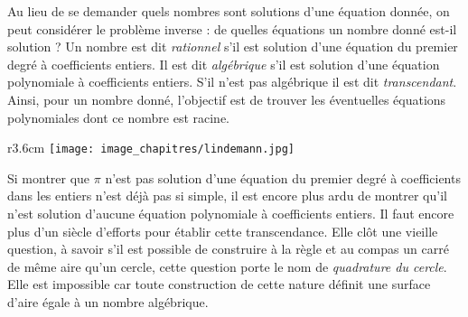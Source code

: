 \begin{His}

Au lieu de se demander quels nombres sont solutions d'une équation donnée, on peut considérer le problème inverse : de quelles équations un nombre donné est-il solution ? Un nombre est dit \textit{rationnel} s'il est solution d'une équation du premier degré à coefficients entiers. Il est dit \textit{algébrique} s'il est solution d'une équation polynomiale à coefficients entiers. S'il n'est pas algébrique il est dit \textit{transcendant}. Ainsi, pour un nombre donné, l'objectif est de trouver les éventuelles équations polynomiales dont ce nombre est racine.

\vspace{0.4cm}


%

\vspace{0.4cm}
\begin{wrapfigure}[10]{r}{3.6cm}
\vspace{-7mm}
\texttt{[image: image\_chapitres/lindemann.jpg]} 
\end{wrapfigure}
Si montrer que $\pi$ n'est pas solution d'une équation du premier degré à coefficients dans les entiers n'est déjà pas si simple, il est encore plus ardu de montrer qu'il n'est solution d'aucune équation polynomiale à coefficients entiers. Il faut encore plus d'un siècle d'efforts pour établir cette transcendance. Elle clôt une vieille question, à savoir s'il est possible de construire à la règle et au compas un carré de même aire qu'un cercle, cette question porte le nom de \textit{quadrature du cercle}. Elle est impossible car toute construction de cette nature définit une surface d'aire égale à un nombre algébrique.
\vspace{0.4cm}


\end{His}
